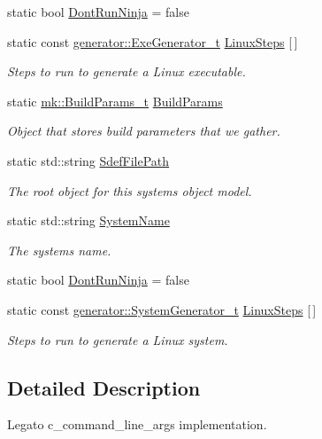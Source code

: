 \begin{DoxyCompactItemize}
static bool \hyperlink{namespacecli_a9aa7b41991b7a654aeaad913f5a2c257}{Dont\+Run\+Ninja} = false
\item 
static const \hyperlink{namespacegenerator_a8cae660bbcd34ce61bd0d4e2d526dac0}{generator\+::\+Exe\+Generator\+\_\+t} \hyperlink{namespacecli_ad23f143312140a2565a854d9f79bb5ad}{Linux\+Steps} \mbox{[}$\,$\mbox{]}
\begin{DoxyCompactList}\small\item\em Steps to run to generate a Linux executable. \end{DoxyCompactList}\item 
static \hyperlink{structmk_1_1_build_params__t}{mk\+::\+Build\+Params\+\_\+t} \hyperlink{namespacecli_a4b3f8be996a29096d321c822dd8a7521}{Build\+Params}
\begin{DoxyCompactList}\small\item\em Object that stores build parameters that we gather. \end{DoxyCompactList}\item 
static std\+::string \hyperlink{namespacecli_ad6e30d8816be2c99041d3dbcc8bf74a4}{Sdef\+File\+Path}
\begin{DoxyCompactList}\small\item\em The root object for this system\textquotesingle{}s object model. \end{DoxyCompactList}\item 
static std\+::string \hyperlink{namespacecli_a577c9d35d55850a04415169a6b5e8586}{System\+Name}
\begin{DoxyCompactList}\small\item\em The system\textquotesingle{}s name. \end{DoxyCompactList}\item 
static bool \hyperlink{namespacecli_a9aa7b41991b7a654aeaad913f5a2c257}{Dont\+Run\+Ninja} = false
\item 
static const \hyperlink{namespacegenerator_a57c2445f43a6255b255135d93e180de5}{generator\+::\+System\+Generator\+\_\+t} \hyperlink{namespacecli_abfa92abddb595e14a7e865ca60a7de47}{Linux\+Steps} \mbox{[}$\,$\mbox{]}
\begin{DoxyCompactList}\small\item\em Steps to run to generate a Linux system. \end{DoxyCompactList}\end{DoxyCompactItemize}


\subsection{Detailed Description}
Legato c\+\_\+command\+\_\+line\+\_\+args implementation.

